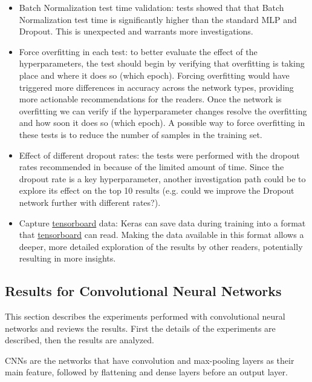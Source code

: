 \documentclass[../CAP6619_term_project_cgarbin.tex]{subfiles}
\begin{document}
\begin{itemize}
\item Batch Normalization test time validation: tests showed that that Batch Normalization test time is significantly higher than the standard MLP and Dropout. This is unexpected and warrants more investigations.
\item Force overfitting in each test: to better evaluate the effect of the hyperparameters, the test should begin by verifying that overfitting is taking place and where it does so (which epoch). Forcing overfitting would have triggered more differences in accuracy across the network types, providing more actionable recommendations for the readers. Once the network is overfitting we can verify if the hyperparameter changes resolve the overfitting and how soon it does so (which epoch). A possible way to force overfitting in these tests is to reduce the number of samples in the training set.
\item Effect of different dropout rates: the tests were performed with the dropout rates recommended in \cite{Srivastava2014} because of the limited amount of time. Since the dropout rate is a key hyperparameter, another investigation path could be to explore its effect on the top 10 results (e.g. could we improve the Dropout network further with different rates?).
\item Capture \href{https://www.tensorflow.org/guide/summaries_and_tensorboard}{tensorboard} data: Keras can save data during training into a format that \href{https://www.tensorflow.org/guide/summaries_and_tensorboard}{tensorboard} can read. Making the data available in this format allows a deeper, more detailed exploration of the results by other readers, potentially resulting in more insights.
\end{itemize}







\subsection{Results for Convolutional Neural Networks}

This section describes the experiments performed with convolutional neural networks and reviews the results. First the details of the experiments are described, then the results are analyzed.

CNNs are the networks that have convolution and max-pooling layers as their main feature, followed by flattening and dense layers before an output layer.
\end{document}
